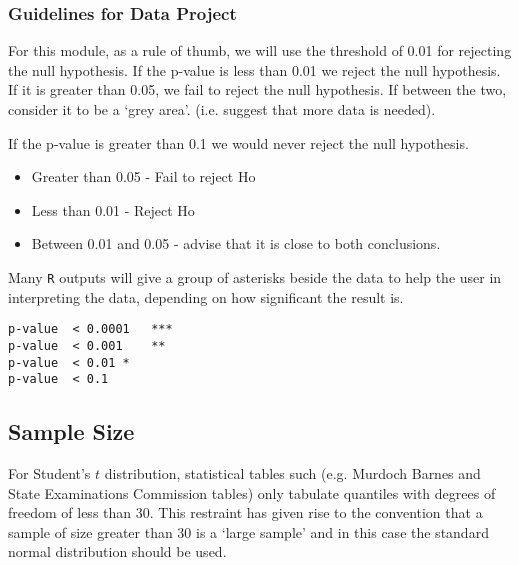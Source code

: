\documentclass[a4paper,12pt]{article}
\begin{document}
\subsubsection{Guidelines for Data Project}
For this module, as a rule of thumb, we will use the threshold of 0.01 for rejecting the null hypothesis. If the p-value is less than 0.01 we reject the null hypothesis. If it is greater than 0.05, we fail to reject the null hypothesis. If between the two, consider it to be a `grey area'. (i.e. suggest that more data is needed).

If the p-value is greater than 0.1 we would never reject the null hypothesis.
\begin{itemize} 
\item Greater than 0.05 - Fail to reject Ho
\item Less than 0.01 - Reject Ho
\item Between 0.01 and 0.05 - advise that it is close to both conclusions.
\end{itemize}


%

Many \texttt{R} outputs will give a group of asterisks beside the data to help the user in interpreting the data, depending on how significant the result is.

\begin{verbatim}
p-value  < 0.0001  	***
p-value  < 0.001	**
p-value  < 0.01	*
p-value  < 0.1
\end{verbatim}



\subsection{Sample Size}
For Student's $t$ distribution, statistical tables such (e.g. Murdoch Barnes and State Examinations Commission tables) only tabulate quantiles with degrees of freedom of less than 30. This restraint has given rise to the convention that a sample of size greater than 30 is a `large sample' and in this case the standard normal distribution should be used.
\end{document}
